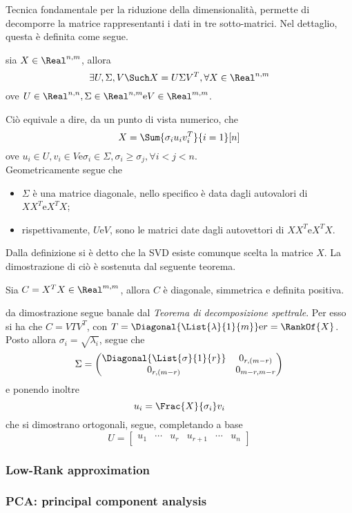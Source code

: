 \documentclass{subfiles}
\begin{document}
Tecnica fondamentale per la riduzione della dimensionalità, permette di decomporre la matrice rappresentanti i dati in tre sotto-matrici.
Nel dettaglio, questa è definita come segue.
\begin{Definition*}
    sia $X \in \Real^{n,m}$, allora
    $$
        \exists U, \Sigma, V \Such X = U\Sigma V^{T}, \forall X \in \Real^{n, m}
    $$
    ove $U \in \Real^{n,n} , \Sigma \in \Real^{n,m} \text{e} V \in \Real^{m,m}$.
\end{Definition*}
Ciò equivale a dire, da un punto di vista numerico, che
$$
    X = \Sum{\sigma_{i}u_{i}v_{i}^{T}}{i = 1}[n]
$$
ove $u_{i} \in U, v_{i} \in V \text{e} \sigma_{i} \in \Sigma, \sigma_{i} \ge \sigma_{j}, \forall i < j < n$.\\
Geometricamente segue che
\begin{itemize}
    \item $\Sigma$ è una matrice diagonale, nello specifico è data dagli autovalori di $XX^{T} \text{e} X^{T}X$;
    \item rispettivamente, $U \text{e} V$, sono le matrici date dagli autovettori di $XX^{T} \text{e} X^{T}X$.
\end{itemize}

Dalla definizione si è detto che la SVD esiste comunque scelta la matrice $X$. La dimostrazione di ciò è sostenuta dal seguente teorema.
\begin{Theorem*}
    Sia $C = X^{T}X \in \Real^{m,m}$, allora $C$ è diagonale, simmetrica e definita positiva.
    \begin{Proof*}
        da dimostrazione segue banale dal \emph{Teorema di decomposizione spettrale}.
        Per esso si ha che $C = V T V^{T}$, con $T = \Diagonal{\List{\lambda}{1}{m}} \text{e} r = \RankOf{X}$.
        Posto allora $\sigma_{i} = \sqrt{\lambda_{i}}$, segue che
        $$\Sigma = \begin{pmatrix}
                \Diagonal{\List{\sigma}{1}{r}} & 0_{r, (m - r)}   \\
                0_{r, (m - r)}                 & 0_{m - r, m - r} \\
            \end{pmatrix}$$
        e ponendo inoltre
        $$
            u_{i} = \Frac{X}{\sigma_{i}}v_{i}
        $$
        che si dimostrano ortogonali, segue, completando a base
        $$U = \begin{bmatrix}
                u_{1} & \cdots & u_{r} & u_{r + 1} & \cdots & u_{n}
            \end{bmatrix}$$
    \end{Proof*}
\end{Theorem*}
\clearpage

\subsubsection{Low-Rank approximation}


\subsubsection{PCA: principal component analysis}

\end{document}
